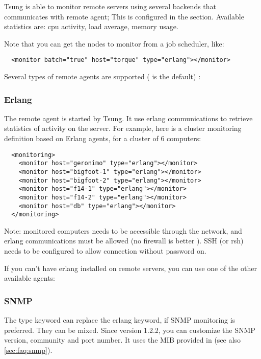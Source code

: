 \documentclass{TSUNG-en}
\begin{document}
Tsung is able to monitor remote servers using several backends that
communicates with remote agent; This
is configured in the  section. Available
statistics are: cpu activity, load average, memory usage.

Note that you can get the nodes to monitor from a job scheduler, like:
\begin{Verbatim}
  <monitor batch="true" host="torque" type="erlang"></monitor>
\end{Verbatim}


Several types of remote agents are supported ( is the default) :

\subsubsection{Erlang}

The remote agent is started by Tsung. It use erlang communications to
retrieve statistics of activity on the server. For example, here is a
cluster monitoring definition based on Erlang agents, for a cluster of
6 computers:

\begin{Verbatim}
  <monitoring>
    <monitor host="geronimo" type="erlang"></monitor>
    <monitor host="bigfoot-1" type="erlang"></monitor>
    <monitor host="bigfoot-2" type="erlang"></monitor>
    <monitor host="f14-1" type="erlang"></monitor>
    <monitor host="f14-2" type="erlang"></monitor>
    <monitor host="db" type="erlang"></monitor>
  </monitoring>
\end{Verbatim}


Note: monitored computers needs to be
accessible through the network, and erlang communications must be
allowed (no firewall is better ). SSH (or rsh) needs to be configured to
allow connection without password on. 

If you can't have erlang installed on remote servers, you can use one
of the other available agents:

\subsubsection{SNMP}
The type keyword  can replace the erlang keyword, if SNMP monitoring
is preferred. They can be mixed. Since version 1.2.2, you can customize the SNMP version,
community and port number. It uses the MIB provided in
 (see also \ref{sec:faq:snmp}).
\end{document}
